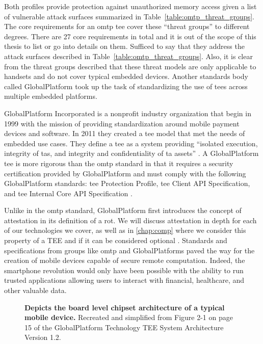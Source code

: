 \renewcommand{\arraystretch}{2}


Both profiles provide protection against unauthorized memory access given a list of vulnerable attack surfaces summarized in Table~\ref{table:omtp_threat_groups}. The core requirements for an \gls{omtp} \gls{tee} cover these ``threat groups'' to different degrees. There are 27 core requirements in total and it is out of the scope of this thesis to list or go into details on them. Sufficed to say that they address the attack surfaces described in Table~\ref{table:omtp_threat_groups}. Also, it is clear from the threat groups described that these threat models are only applicable to handsets and do not cover typical embedded devices. Another standards body called GlobalPlatform took up the task of standardizing the use of \glspl{tee} across multiple embedded platforms.

GlobalPlatform Incorporated is a nonprofit industry organization that begin in 1999 with the mission of providing standardization around mobile payment devices and software. In 2011 they created a \gls{tee} model \cite{GlobalPlatform2018} that met the needs of embedded use cases. They define a \gls{tee} as a system providing ``isolated execution, integrity of \glspl{ta}, and integrity and confidentiality of \gls{ta} assets'' \cite{GlobalPlatform2018} . A GlobalPlatform \gls{tee} is more rigorous than the \gls{omtp} standard in that it requires a security certification provided by GlobalPlatform and must comply with the following GlobalPlatform standards: \gls{tee} Protection Profile, \gls{tee} Client API Specification, and \gls{tee} Internal Core API Specification \cite{GPD2, GPD3, GPD4}.

Unlike in the \gls{omtp} standard, GlobalPlatform first introduces the concept of \gls{attestation} in its definition of a \gls{rot}. We will discuss \gls{attestation} in depth for each of our technologies we cover, as well as in \autoref{chap:comp} where we consider this property of a TEE and if it can be considered optional \cite{cccTAC}. Standards and specifications from groups like \gls{omtp} and GlobalPlatforms paved the way for the creation of mobile devices capable of secure remote computation. Indeed, the smartphone revolution would only have been possible with the ability to run trusted applications allowing users to interact with financial, healthcare, and other valuable data.

\begin{figure}[htbp]
\centering

\caption[GlobalPlatforms Typical Chipset Architecture]{\textbf{Depicts the board level chipset architecture of a typical mobile device.} Recreated and simplified from Figure 2-1 on page 15 of the GlobalPlatform Technology TEE System Architecture Version 1.2. \cite{GlobalPlatform2018}}
\label{fig:gpd-tee}
\end{figure}

